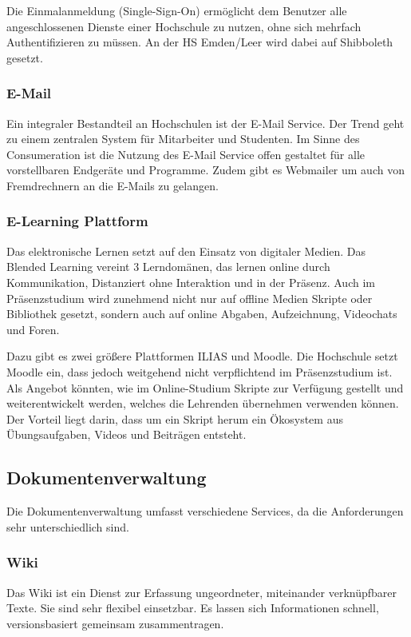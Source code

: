 \documentclass[a4paper, 12pt]{scrreprt}
\begin{document}
Die Einmalanmeldung (Single-Sign-On) ermöglicht dem Benutzer alle angeschlossenen Dienste einer Hochschule zu nutzen, ohne sich mehrfach Authentifizieren zu müssen. An der HS Emden/Leer wird dabei auf Shibboleth gesetzt. 

\subsubsection{E-Mail}
Ein integraler Bestandteil an Hochschulen ist der E-Mail Service. Der Trend geht zu einem zentralen System für Mitarbeiter und Studenten. Im Sinne des Consumeration ist die Nutzung des E-Mail Service offen gestaltet für alle vorstellbaren Endgeräte und Programme. Zudem gibt es Webmailer um auch von Fremdrechnern an die E-Mails zu gelangen.

\subsubsection{E-Learning Plattform}
Das elektronische Lernen setzt auf den Einsatz von digitaler Medien.
Das Blended Learning vereint 3 Lerndomänen, das lernen online durch Kommunikation, Distanziert ohne Interaktion und in der Präsenz. Auch im Präsenzstudium wird zunehmend nicht nur auf offline Medien Skripte oder Bibliothek gesetzt, sondern auch auf online Abgaben, Aufzeichnung, Videochats und Foren.

Dazu gibt es zwei größere Plattformen ILIAS und Moodle. Die Hochschule setzt Moodle ein, dass jedoch weitgehend nicht verpflichtend im Präsenzstudium ist. Als Angebot könnten, wie im Online-Studium Skripte zur Verfügung gestellt und weiterentwickelt werden, welches die Lehrenden übernehmen verwenden können. Der Vorteil liegt darin, dass um ein Skript herum ein Ökosystem aus Übungsaufgaben, Videos und Beiträgen entsteht.


\subsection{Dokumentenverwaltung}
Die Dokumentenverwaltung umfasst verschiedene Services, da die Anforderungen sehr unterschiedlich sind.


\subsubsection{Wiki}
Das Wiki ist ein Dienst zur Erfassung ungeordneter, miteinander verknüpfbarer Texte. Sie sind sehr flexibel einsetzbar. Es lassen sich Informationen schnell, versionsbasiert gemeinsam zusammentragen.
\end{document}
